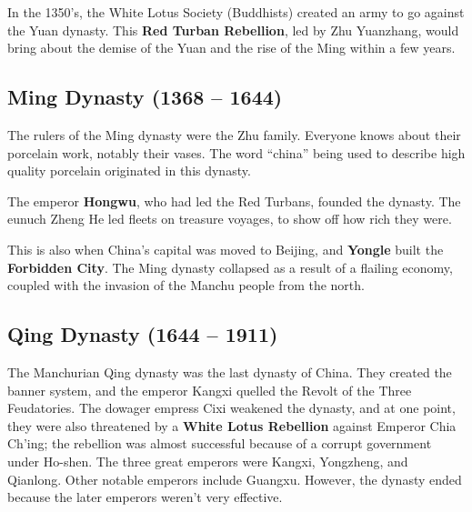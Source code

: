 In the 1350's, the White Lotus Society (Buddhists) created an army to go against the Yuan dynasty.
This \textbf{Red Turban Rebellion}, led by Zhu Yuanzhang,
would bring about the demise of the Yuan and the rise of the Ming within a few years.

\subsection*{Ming Dynasty (1368 -- 1644)}

The rulers of the Ming dynasty were the Zhu family.
Everyone knows about their porcelain work, notably their vases.
The word ``china'' being used to describe high quality porcelain originated in this dynasty.

The emperor \textbf{Hongwu}, who had led the Red Turbans, founded the dynasty.
The eunuch Zheng He led fleets on treasure voyages, to show off how rich they were.

This is also when China's capital was moved to Beijing, and \textbf{Yongle} built the \textbf{Forbidden City}.
The Ming dynasty collapsed as a result of a flailing economy,
coupled with the invasion of the Manchu people from the north.

\subsection*{Qing Dynasty (1644 -- 1911)}

The Manchurian Qing dynasty was the last dynasty of China.
They created the banner system, and the emperor Kangxi quelled the Revolt of the Three Feudatories.
The dowager empress Cixi weakened the dynasty, and at one point,
they were also threatened by a \textbf{White Lotus Rebellion} against Emperor Chia Ch'ing;
the rebellion was almost successful because of a corrupt government under Ho-shen.
The three great emperors were Kangxi, Yongzheng, and Qianlong.
Other notable emperors include Guangxu.
However, the dynasty ended because the later emperors weren't very effective.


